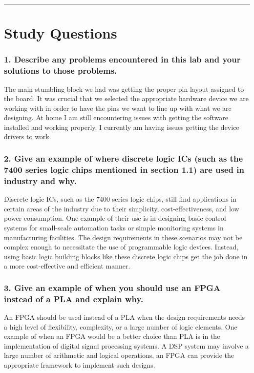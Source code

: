\documentclass[11pt]{article}
\begin{document}
\vspace{5mm}
\hrule

\section*{\textcolor{mycolor}{Study Questions}}
\subsubsection*{\textcolor{mycolor}{1. Describe any problems encountered in this lab and your solutions to those problems.}}
The main stumbling block we had was getting the proper pin layout assigned to the board. It was crucial that we selected the appropriate hardware device we are working with in order to have the pins we want to line up with what we are designing. At home I am still encountering issues with getting the software installed and working properly. I currently am having issues getting the device drivers to work.
\subsubsection*{\textcolor{mycolor}{2. Give an example of where discrete logic ICs (such as the 7400 series logic chips mentioned in
section 1.1) are used in industry and why.}}
Discrete logic ICs, such as the 7400 series logic chips, still find applications in certain areas of the industry due to their simplicity, cost-effectiveness, and low power consumption. One example of their use is in designing basic control systems for small-scale automation tasks or simple monitoring systems in manufacturing facilities. The design requirements in these scenarios may not be complex enough to necessitate the use of programmable logic devices. Instead, using basic logic building blocks like these discrete logic chips get the job done in a more cost-effective and efficient manner.
\subsubsection*{\textcolor{mycolor}{3. Give an example of when you should use an FPGA instead of a PLA and explain why.}}
An FPGA should be used instead of a PLA when the design requirements needs a high level of flexibility, complexity, or a large number of logic elements. One example of when an FPGA would be a better choice than PLA is in the implementation of digital signal processing systems. A DSP system may involve a large number of arithmetic and logical operations, an FPGA can provide the appropriate framework to implement such designs.
\end{document}
